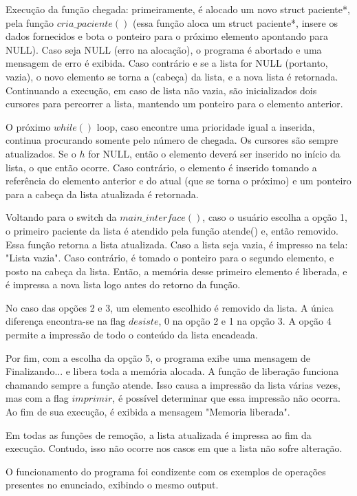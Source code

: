 \documentclass{article}
\begin{document}
Execução da função chegada: primeiramente, é alocado um novo struct paciente*, pela função $cria\_paciente()$ (essa função aloca um struct paciente*, insere os dados fornecidos e bota o ponteiro para o próximo elemento apontando para NULL). Caso seja NULL (erro na alocação), o programa é abortado e uma mensagem de erro é exibida. Caso contrário e se a lista for NULL (portanto, vazia), o novo elemento se torna a (cabeça) da lista, e a nova lista é retornada. Continuando a execução, em caso de lista não vazia, são inicializados dois cursores para percorrer a lista, mantendo um ponteiro para o elemento anterior.

O próximo $while()$ loop, caso encontre uma prioridade igual a inserida, continua procurando somente pelo número de chegada. Os cursores são sempre atualizados. Se o $h$ for NULL, então o elemento deverá ser inserido no início da lista, o que então ocorre. Caso contrário, o elemento é inserido tomando a referência do elemento anterior e do atual (que se torna o próximo) e um ponteiro para a cabeça da lista atualizada é retornada.

Voltando para o switch da $main\_interface()$, caso o usuário escolha a opção 1, o primeiro paciente da lista é atendido pela função atende() e, então removido. Essa função retorna a lista atualizada. Caso a lista seja vazia, é impresso na tela: "Lista vazia". Caso contrário, é tomado o ponteiro para o segundo elemento, e posto na cabeça da lista. Então, a memória desse primeiro elemento é liberada, e é impressa a nova lista logo antes do retorno da função.

No caso das opções 2 e 3, um elemento escolhido é removido da lista. A única diferença encontra-se na flag $desiste$, 0 na opção 2 e 1 na opção 3. A opção 4 permite a impressão de todo o conteúdo da lista encadeada.

Por fim, com a escolha da opção 5, o programa exibe uma mensagem de Finalizando... e libera toda a memória alocada. A função de liberação funciona chamando sempre a função atende. Isso causa a impressão da lista várias vezes, mas com a flag $imprimir$, é possível determinar que essa impressão não ocorra. Ao fim de sua execução, é exibida a mensagem "Memoria liberada".

Em todas as funções de remoção, a lista atualizada é impressa ao fim da execução. Contudo, isso não ocorre nos casos em que a lista não sofre alteração.

O funcionamento do programa foi condizente com os exemplos de operações presentes no enunciado, exibindo o mesmo output.
\end{document}
